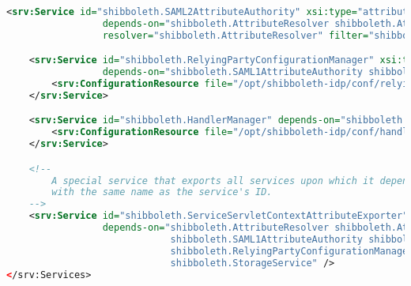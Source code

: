 \begin{lstlisting}[language=xml]
    <srv:Service id="shibboleth.SAML2AttributeAuthority" xsi:type="attribute-authority:SAML2AttributeAuthority"
                 depends-on="shibboleth.AttributeResolver shibboleth.AttributeFilterEngine"
                 resolver="shibboleth.AttributeResolver" filter="shibboleth.AttributeFilterEngine"/>

    <srv:Service id="shibboleth.RelyingPartyConfigurationManager" xsi:type="relyingParty:SAMLMDRelyingPartyConfigurationManager"
                 depends-on="shibboleth.SAML1AttributeAuthority shibboleth.SAML2AttributeAuthority">
        <srv:ConfigurationResource file="/opt/shibboleth-idp/conf/relying-party.xml" xsi:type="resource:FilesystemResource"/>
    </srv:Service>

    <srv:Service id="shibboleth.HandlerManager" depends-on="shibboleth.RelyingPartyConfigurationManager" xsi:type="profile:IdPProfileHandlerManager">
        <srv:ConfigurationResource file="/opt/shibboleth-idp/conf/handler.xml" xsi:type="resource:FilesystemResource"/>
    </srv:Service>

    <!--
        A special service that exports all services upon which it depends into the ServletContext as an attribute
        with the same name as the service's ID.
    -->
    <srv:Service id="shibboleth.ServiceServletContextAttributeExporter" xsi:type="srv:ServletContextAttributeExporter"
                 depends-on="shibboleth.AttributeResolver shibboleth.AttributeFilterEngine
                             shibboleth.SAML1AttributeAuthority shibboleth.SAML2AttributeAuthority
                             shibboleth.RelyingPartyConfigurationManager shibboleth.HandlerManager
                             shibboleth.StorageService" />
</srv:Services>
\end{lstlisting}

